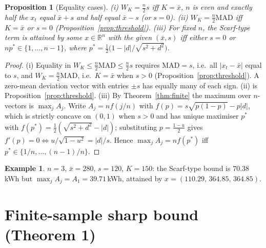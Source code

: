 \documentclass[11pt,a4paper]{article}
\theoremstyle{definition}
\theoremstyle{plain}\newtheorem{sprop}{Proposition}[section]\newtheorem{slemma}[sprop]{Lemma}\newtheorem{scor}[sprop]{Corollary}
\theoremstyle{definition}
\newtheorem{example}{Example}
\theoremstyle{remark}
\newcommand{\xbar}{\bar{x}}
\numberwithin{equation}{section}
\begin{document}
\begin{sprop}[Equality cases]\label{prop:eq}
(i) $W_K=\frac n2 s$ iff $K=\xbar$, $n$ is even and exactly half the $x_t$ equal $\xbar+s$ and half equal $\xbar-s$ (or $s=0$).
(ii) $W_K=\frac n2\mathrm{MAD}$ iff $K=\xbar$ or $s=0$ (Proposition~\ref{prop:threshold}).
(iii) For fixed $n$, the Scarf-type term is attained by some $x\in\mathbb R^n$ with the given $(\xbar,s)$ iff either $s=0$ or $n p^\ast\in\{1,\dots,n-1\}$, where $p^\ast=\frac12\big(1-|d|/\sqrt{s^2+d^2}\big)$.
\end{sprop}
\begin{proof}
(i) Equality in $W_K\le\frac n2\mathrm{MAD}\le\frac n2 s$ requires $\mathrm{MAD}=s$, i.e.\ all $|x_t-\xbar|$ equal to $s$, and $W_K=\frac n2\mathrm{MAD}$, i.e.\ $K=\xbar$ when $s>0$ (Proposition~\ref{prop:threshold}). A zero-mean deviation vector with entries $\pm s$ has equally many of each sign. (ii) is Proposition~\ref{prop:threshold}. (iii) By Theorem~\ref{thm:finite} the maximum over $n$-vectors is $\max_jA_j$. Write $A_j=n f(j/n)$ with $f(p)=s\sqrt{p(1-p)}-p|d|$, which is strictly concave on $(0,1)$ when $s>0$ and has unique maximiser $p^\ast$ with $f(p^\ast)=\frac12(\sqrt{s^2+d^2}-|d|)$; substituting $p=\frac{1-u}{2}$ gives $f'(p)=0\iff u/\sqrt{1-u^2}=|d|/s$. Hence $\max_jA_j=nf(p^\ast)$ iff $p^\ast\in\{1/n,\dots,(n-1)/n\}$.
\end{proof}

\begin{example}
$n=3$, $\xbar=280$, $s=120$, $K=150$: the Scarf-type bound is $70.38$\,kWh but $\max_jA_j=A_1=39.71$\,kWh, attained by $x=(110.29,\,364.85,\,364.85)$.
\end{example}

\section{Finite-sample sharp bound (Theorem 1)}\label{sec:S5}
\end{document}
